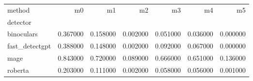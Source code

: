\begin{tabular}{lrrrrrr}
\toprule
method & m0 & m1 & m2 & m3 & m4 & m5 \\
detector &  &  &  &  &  &  \\
\midrule
binoculars & 0.367000 & 0.158000 & 0.002000 & 0.051000 & 0.036000 & 0.000000 \\
fast_detectgpt & 0.388000 & 0.148000 & 0.002000 & 0.092000 & 0.067000 & 0.000000 \\
mage & 0.843000 & 0.720000 & 0.089000 & 0.666000 & 0.651000 & 0.136000 \\
roberta & 0.203000 & 0.111000 & 0.002000 & 0.058000 & 0.056000 & 0.001000 \\
\bottomrule
\end{tabular}
